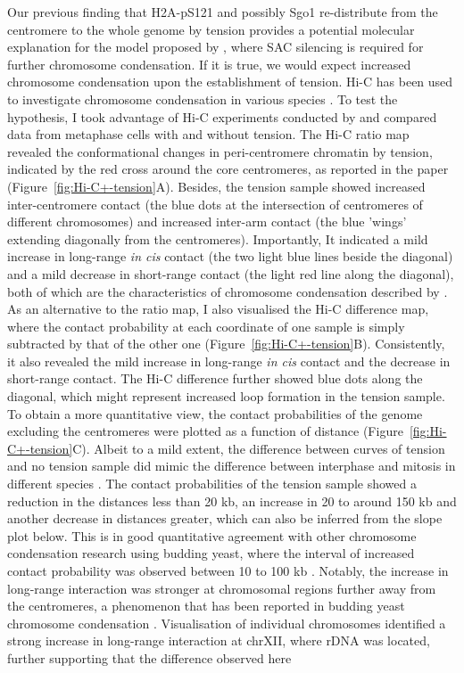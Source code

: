 Our previous finding that H2A-pS121 and possibly Sgo1 re-distribute from the centromere to the whole genome by tension provides a potential molecular explanation for the model proposed by \cite{Kruitwagen2018}, where SAC silencing is required for further chromosome condensation. If it is true, we would expect increased chromosome condensation upon the establishment of tension. Hi-C has been used to investigate chromosome condensation in various species \citep{Kakui2017Condensin-mediatedYeast, Schalbetter2017SMCContext, Lazar-Stefanita2017CohesinsCellcycle, Naumova2013OrganizationChromosome}. To test the hypothesis, I took advantage of Hi-C experiments conducted by \cite{Paldi2020ConvergentPericentromeres} and compared data from metaphase cells with and without tension. The Hi-C ratio map revealed the conformational changes in peri-centromere chromatin by tension, indicated by the red cross around the core centromeres, as reported in the paper (Figure~\ref{fig:Hi-C+-tension}A). Besides, the tension sample showed increased inter-centromere contact (the blue dots at the intersection of centromeres of different chromosomes) and increased inter-arm contact (the blue 'wings' extending diagonally from the centromeres). Importantly, It indicated a mild increase in long-range \textit{in cis} contact (the two light blue lines beside the diagonal) and a mild decrease in short-range contact (the light red line along the diagonal), both of which are the characteristics of chromosome condensation described by \cite{Kakui2018SMCLandscape}. As an alternative to the ratio map, I also visualised the Hi-C difference map, where the contact probability at each coordinate of one sample is simply subtracted by that of the other one (Figure~\ref{fig:Hi-C+-tension}B). Consistently, it also revealed the mild increase in long-range \textit{in cis} contact and the decrease in short-range contact. The Hi-C difference further showed blue dots along the diagonal, which might represent increased loop formation in the tension sample. To obtain a more quantitative view, the contact probabilities of the genome excluding the centromeres were plotted as a function of distance (Figure~\ref{fig:Hi-C+-tension}C). Albeit to a mild extent, the difference between curves of tension and no tension sample did mimic the difference between interphase and mitosis in different species \citep{Kakui2018SMCLandscape}. The contact probabilities of the tension sample showed a reduction in the distances less than 20 kb, an increase in 20 to around 150 kb and another decrease in distances greater, which can also be inferred from the slope plot below. This is in good quantitative agreement with other chromosome condensation research using budding yeast, where the interval of increased contact probability was observed between 10 to 100 kb \citep{Kakui2018SMCLandscape, Schalbetter2017SMCContext, Lazar-Stefanita2017CohesinsCellcycle}. Notably, the increase in long-range interaction was stronger at chromosomal regions further away from the centromeres, a phenomenon that has been reported in budding yeast chromosome condensation \citep{Neurohr2011ALength}. Visualisation of individual chromosomes identified a strong increase in long-range interaction at chrXII, where rDNA was located, further supporting that the difference observed here 